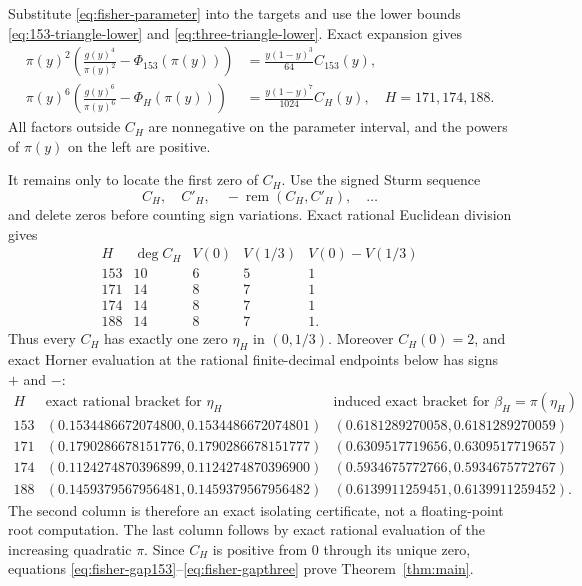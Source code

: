 \documentclass[11pt]{article}
\begin{document}
Substitute \eqref{eq:fisher-parameter} into the targets and use the lower
bounds \eqref{eq:153-triangle-lower} and
\eqref{eq:three-triangle-lower}.  Exact expansion gives
\begin{align}
 \pi(y)^2\left(\frac{g(y)^4}{\pi(y)^2}
       -\Phi_{153}(\pi(y))\right)
 &=\frac{y(1-y)^3}{64}C_{153}(y),
 \label{eq:fisher-gap153}\\
 \pi(y)^6\left(\frac{g(y)^6}{\pi(y)^6}
       -\Phi_H(\pi(y))\right)
 &=\frac{y(1-y)^7}{1024}C_H(y),
 \quad H=171,174,188.
 \label{eq:fisher-gapthree}
\end{align}
All factors outside $C_H$ are nonnegative on the parameter interval, and
the powers of $\pi(y)$ on the left are positive.

It remains only to locate the first zero of $C_H$.  Use the signed Sturm
sequence
\[
 C_H,\quad C'_H,\quad-\operatorname{rem}(C_H,C'_H),\quad\ldots
\]
and delete zeros before counting sign variations.  Exact rational Euclidean
division gives
\[
\begin{array}{c|c|c|c|c}
H&\deg C_H&V(0)&V(1/3)&V(0)-V(1/3)\\ \hline
153&10&6&5&1\\
171&14&8&7&1\\
174&14&8&7&1\\
188&14&8&7&1.
\end{array}
\]
Thus every $C_H$ has exactly one zero $\eta_H$ in $(0,1/3)$.  Moreover
$C_H(0)=2$, and exact Horner evaluation at the rational finite-decimal
endpoints below has signs $+$ and $-$:
\[
\begin{array}{c|c|c}
H&\text{exact rational bracket for }\eta_H&
  \text{induced exact bracket for }\beta_H=\pi(\eta_H)\\ \hline
153&(0.1534486672074800,0.1534486672074801)&
 (0.6181289270058,0.6181289270059)\\
171&(0.1790286678151776,0.1790286678151777)&
 (0.6309517719656,0.6309517719657)\\
174&(0.1124274870396899,0.1124274870396900)&
 (0.5934675772766,0.5934675772767)\\
188&(0.1459379567956481,0.1459379567956482)&
 (0.6139911259451,0.6139911259452).
\end{array}
\]
The second column is therefore an exact isolating certificate, not a
floating-point root computation.  The last column follows by exact rational
evaluation of the increasing quadratic $\pi$.  Since $C_H$ is positive
from $0$ through its unique zero, equations
\eqref{eq:fisher-gap153}--\eqref{eq:fisher-gapthree} prove
Theorem~\ref{thm:main}.
\end{document}
